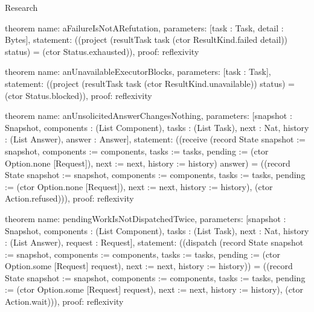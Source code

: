 \begin{lexlean}{Research}
\begin{semanticmodule}
theorem{
  name: aFailureIsNotARefutation,
  parameters: [task : Task, detail : Bytes],
  statement: ((project (resultTask task (ctor ResultKind.failed detail)) status) = (ctor Status.exhausted)),
  proof: reflexivity{}
}

theorem{
  name: anUnavailableExecutorBlocks,
  parameters: [task : Task],
  statement: ((project (resultTask task (ctor ResultKind.unavailable)) status) = (ctor Status.blocked)),
  proof: reflexivity{}
}

theorem{
  name: anUnsolicitedAnswerChangesNothing,
  parameters: [snapshot : Snapshot, components : (List Component), tasks : (List Task), next : Nat, history : (List Answer), answer : Answer],
  statement: ((receive (record State {snapshot := snapshot, components := components, tasks := tasks, pending := (ctor Option.none [Request]), next := next, history := history}) answer) = ((record State {snapshot := snapshot, components := components, tasks := tasks, pending := (ctor Option.none [Request]), next := next, history := history}), (ctor Action.refused))),
  proof: reflexivity{}
}

theorem{
  name: pendingWorkIsNotDispatchedTwice,
  parameters: [snapshot : Snapshot, components : (List Component), tasks : (List Task), next : Nat, history : (List Answer), request : Request],
  statement: ((dispatch (record State {snapshot := snapshot, components := components, tasks := tasks, pending := (ctor Option.some [Request] request), next := next, history := history})) = ((record State {snapshot := snapshot, components := components, tasks := tasks, pending := (ctor Option.some [Request] request), next := next, history := history}), (ctor Action.wait))),
  proof: reflexivity{}
}
\end{semanticmodule}
\end{lexlean}
